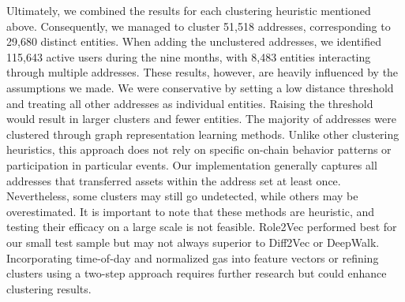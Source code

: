 \documentclass[12pt,a4paper,titlepage,oneside,english]{article}
\begin{document}
Ultimately, we combined the results for each clustering heuristic mentioned above. Consequently, we managed to cluster 51,518 addresses, corresponding to 29,680 distinct entities. When adding the unclustered addresses, we identified 115,643 active users during the nine months, with 8,483 entities interacting through multiple addresses. \newline
These results, however, are heavily influenced by the assumptions we made. We were conservative by setting a low distance threshold and treating all other addresses as individual entities. Raising the threshold would result in larger clusters and fewer entities. \newline 
The majority of addresses were clustered through graph representation learning methods. Unlike other clustering heuristics, this approach does not rely on specific on-chain behavior patterns or participation in particular events. Our implementation generally captures all addresses that transferred assets within the address set at least once. Nevertheless, some clusters may still go undetected, while others may be overestimated. It is important to note that these methods are heuristic, and testing their efficacy on a large scale is not feasible. \newline
Role2Vec performed best for our small test sample but may not always superior to Diff2Vec or DeepWalk. Incorporating time-of-day and normalized gas into feature vectors or refining clusters using a two-step approach requires further research but could enhance clustering results.

\end{document}
